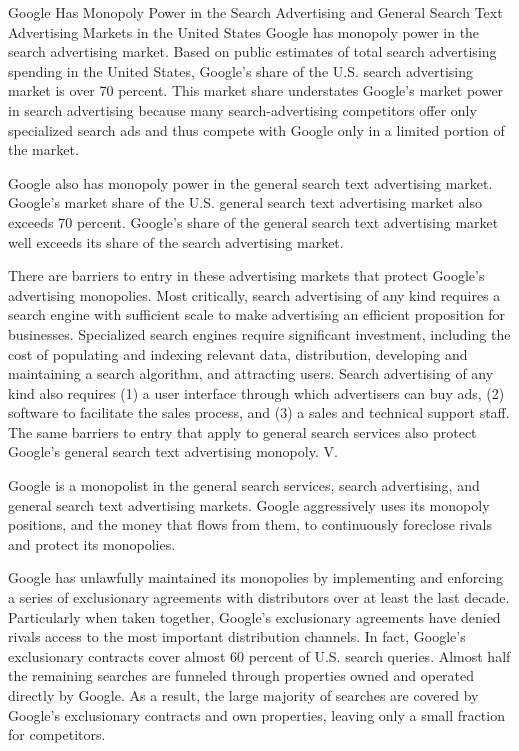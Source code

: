 \documentclass[11pt,b5paper]{scrartcl}
\begin{document}



Google Has Monopoly Power in the Search Advertising and General
Search Text Advertising Markets in the United States
Google has monopoly power in the search advertising market. Based on public
estimates of total search advertising spending in the United States, Google’s share of the U.S.
search advertising market is over 70 percent. This market share understates Google’s market
power in search advertising because many search-advertising competitors offer only specialized
search ads and thus compete with Google only in a limited portion of the market.


Google also has monopoly power in the general search text advertising market.
Google’s market share of the U.S. general search text advertising market also exceeds
70 percent. Google’s share of the general search text advertising market well exceeds its share of
the search advertising market.


There are barriers to entry in these advertising markets that protect Google’s
advertising monopolies. Most critically, search advertising of any kind requires a search engine
with sufficient scale to make advertising an efficient proposition for businesses. Specialized
search engines require significant investment, including the cost of populating and indexing
relevant data, distribution, developing and maintaining a search algorithm, and attracting users.
Search advertising of any kind also requires (1) a user interface through which advertisers can
buy ads, (2) software to facilitate the sales process, and (3) a sales and technical support staff.
The same barriers to entry that apply to general search services also protect Google’s general
search text advertising monopoly.
V.


Google is a monopolist in the general search services, search advertising, and
general search text advertising markets. Google aggressively uses its monopoly positions, and
the money that flows from them, to continuously foreclose rivals and protect its monopolies.


Google has unlawfully maintained its monopolies by implementing and enforcing
a series of exclusionary agreements with distributors over at least the last decade. Particularly
when taken together, Google’s exclusionary agreements have denied rivals access to the most
important distribution channels. In fact, Google’s exclusionary contracts cover almost 60 percent
of U.S. search queries. Almost half the remaining searches are funneled through properties
owned and operated directly by Google. As a result, the large majority of searches are covered
by Google’s exclusionary contracts and own properties, leaving only a small fraction for
competitors.
\end{document}
